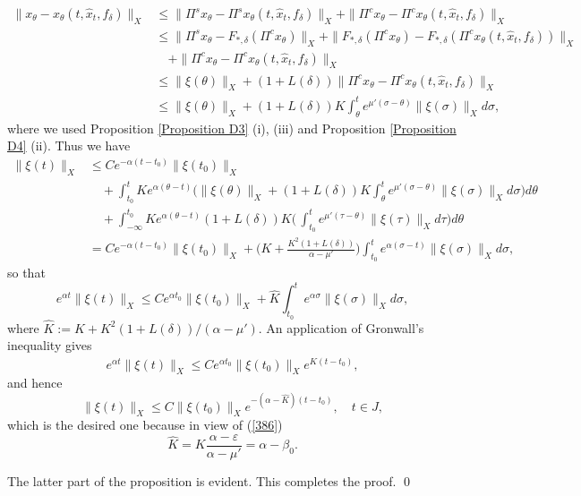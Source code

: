 \documentclass[12pt]{amsart}
\begin{document}
\begin{align*}
   \|x_{\theta}-x_{\theta}(t,\hat x_t,f_\delta) \|_X
   &\leq \|\Pi^s x_{\theta}-\Pi^s x_{\theta}(t,\hat x_t,f_\delta) \|_X
          + \|\Pi^c x_{\theta}- \Pi^c x_{\theta}(t,\hat x_t,f_\delta) \|_X  \\
   &\leq \|\Pi^s x_{\theta}- F_{\ast,\delta}(\Pi^c x_{\theta}) \|_X
          +\|F_{\ast,\delta}(\Pi^c x_{\theta})- F_{\ast,\delta}(\Pi^c x_{\theta}(t,\hat x_t,f_\delta)) \|_X \\
   &\quad +\|\Pi^c x_{\theta}- \Pi^c x_{\theta}(t,\hat x_t,f_\delta) \|_X  \\  
   &\leq \|\xi(\theta)\|_X +(1+L(\delta)) \|\Pi^c x_{\theta}- \Pi^c x_{\theta}(t,\hat x_t,f_\delta) \|_X \\
   &\leq \|\xi(\theta)\|_X +(1+L(\delta)) K\int_{\theta}^t e^{\mu'(\sigma-\theta)}\|\xi(\sigma)\|_Xd\sigma,       
\end{align*}
where we used Proposition \ref{Proposition D3} (i), (iii) and 
Proposition \ref{Proposition D4} (ii). Thus we have 
\begin{align*} 
   \|\xi(t)\|_X 
   &\leq  Ce^{-\alpha (t-t_0)}\|\xi(t_0)\|_X  \\
   &\quad + \int_{t_0}^t Ke^{\alpha (\theta-t)}
          \Big( \|\xi(\theta)\|_X 
          +(1+L(\delta)) K\int_{\theta}^t e^{\mu'(\sigma-\theta)}\|\xi(\sigma)\|_Xd\sigma\Big) d\theta  \\ 
   &\quad + \int_{-\infty}^{t_0} Ke^{\alpha (\theta-t)} 
          (1+L(\delta)) K\Big(\,\int_{t_0}^t e^{\mu'(\tau-\theta)}\|\xi(\tau)\|_Xd\tau \Big)d\theta   \\
   &= Ce^{-\alpha (t-t_0)}\|\xi(t_0)\|_X 
        +\Big(K+\frac{K^2(1+L(\delta))}{\alpha -\mu'}\Big) \int_{t_0}^t e^{\alpha (\sigma-t)}\|\xi(\sigma)\|_X d\sigma,     
\end{align*} 
so that 
$$
   e^{\alpha t} \|\xi(t)\|_X 
   \leq Ce^{\alpha t_0} \|\xi(t_0)\|_X 
        +\hat K  \int_{t_0}^t e^{\alpha \sigma}\|\xi(\sigma)\|_X d\sigma,
$$
where $\hat K:=K+K^2(1+L(\delta))/(\alpha -\mu')$. An application of 
Gronwall's inequality gives 
$$
   e^{\alpha t} \|\xi(t)\|_X
   \leq Ce^{\alpha t_0} \|\xi(t_0)\|_X e^{\hat K(t-t_0)},
$$
and hence 
$$
   \|\xi(t)\|_X 
   \leq C \|\xi(t_0)\|_X e^{-(\alpha -\hat K)(t-t_0)}, \quad t\in J,
$$
which is the desired one because in view of (\ref{386}) 
$$
   \hat K=K\frac{\alpha -\varepsilon }{\alpha -\mu'}=\alpha -\beta_0. 
$$

The latter part of the proposition is evident. This completes the proof. \qed
\end{document}
